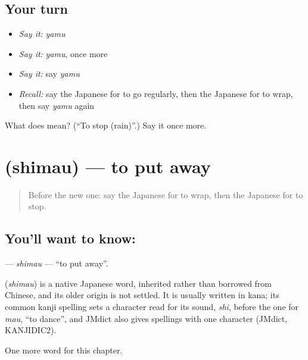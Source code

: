 \subsection*{Your turn}
\begin{itemize}
\raggedright
  \item \emph{Say it:} \emph{yamu}
  \item \emph{Say it:} \emph{yamu}, once more
  \item \emph{Say it:} say \emph{yamu}
  \item \emph{Recall:} say the Japanese for to go regularly, then the Japanese for to wrap, then say \emph{yamu} again
\end{itemize}

\begin{tcolorbox}[breakable,colback=teal!4,colframe=teal!35!black,title={Before you move on}]
What does  mean? (\textquotedblleft{}To stop (rain)\textquotedblright{}.) Say it once more.
\end{tcolorbox}
\section[\texorpdfstring{\ja{しまう} (shimau)}{しまう (shimau)}]{ (shimau) — to put away}

\label{lesson:JA-C91-shimau}



\begin{quote}
Before the new one: say the Japanese for to wrap, then the Japanese for to stop.
\end{quote}

\subsection*{You'll want to know: }
\textbf{} — \emph{shimau} — \textquotedblleft{}to put away\textquotedblright{}.

\begin{cousinweb}
\textbf{} (\emph{shimau}) is a native Japanese word, inherited rather than borrowed from Chinese, and its older origin is not settled. It is usually written in kana; its common kanji spelling sets a character read for its sound, \emph{shi}, before the one for \emph{mau}, \textquotedblleft{}to dance\textquotedblright{}, and JMdict also gives spellings with one character (JMdict, KANJIDIC2).
\end{cousinweb}

\begin{grammarlens}[title={What you've built}]
One more word for this chapter.
\end{grammarlens}

